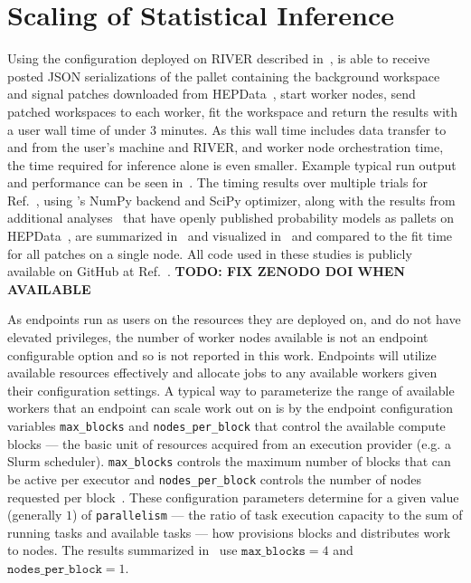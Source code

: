 \section{Scaling of Statistical Inference}\label{sec:results}
%
Using the \funcX{} configuration deployed on RIVER described in~, \funcX{} is able to receive posted JSON serializations of the \pyhf{} pallet containing the background workspace and signal patches downloaded from HEPData~\cite{ATLAS_SUSY_1Lbb_pallet}, start \funcX{} worker nodes, send patched workspaces to each worker, fit the workspace and return the results with a user wall time of under 3 minutes.
As this wall time includes data transfer to and from the user's machine and RIVER, and worker node orchestration time, the time required for inference alone is even smaller.
Example typical run output and performance can be seen in~.
The timing results over multiple trials for Ref.~\cite{ATLAS_SUSY_1Lbb_pallet}, using \pyhf{}'s NumPy backend and SciPy optimizer, along with the results from additional analyses~\cite{SUSY-2018-09,SUSY-2018-04} that have openly published probability models as \pyhf{} pallets on HEPData~\cite{ATLAS_SUSY_SS3L_pallet,ATLAS_SUSY_staus_pallet}, are summarized in~ and visualized in~ and compared to the fit time for all patches on a single node.
All code used in these studies is publicly available on GitHub at Ref.~\cite{study_code,study_code_zenodo_doi}.
\textbf{TODO: FIX ZENODO DOI WHEN AVAILABLE}

As \funcX{} endpoints run as users on the resources they are deployed on, and do not have elevated privileges, the number of worker nodes available is not an endpoint configurable option and so is not reported in this work.
Endpoints will utilize available resources effectively and allocate jobs to any available workers given their configuration settings.
A typical way to parameterize the range of available workers that an endpoint can scale work out on is by the \funcX{} endpoint configuration variables \texttt{max\_blocks} and \texttt{nodes\_per\_block} that control the available compute blocks --- the basic unit of resources acquired from an execution provider (e.g. a Slurm scheduler).
\texttt{max\_blocks} controls the maximum number of blocks that can be active per \funcX{} executor and \texttt{nodes\_per\_block} controls the number of nodes requested per block~\cite{Parsl_paper}.
These configuration parameters determine for a given value (generally $1$) of \texttt{parallelism} --- the ratio of task execution capacity to the sum of running tasks and available tasks --- how \funcX{} provisions blocks and distributes work to nodes.
The results summarized in~ use $\texttt{max\_blocks}=4$ and $\texttt{nodes\_per\_block}=1$.

